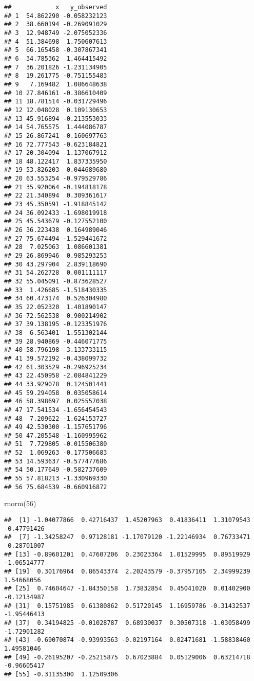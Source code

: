 \documentclass[
]{article}
\newenvironment{Shaded}{\begin{snugshade}}{\end{snugshade}}
\newcommand{\DecValTok}[1]{\textcolor[rgb]{0.00,0.00,0.81}{#1}}
\newcommand{\FunctionTok}[1]{\textcolor[rgb]{0.00,0.00,0.00}{#1}}
\newcommand{\NormalTok}[1]{#1}
\begin{document}
\begin{verbatim}
##            x   y_observed
## 1  54.862290 -0.058232123
## 2  38.660194 -0.269091029
## 3  12.948749 -2.075052336
## 4  51.384698  1.750607613
## 5  66.165458 -0.307867341
## 6  34.785362  1.464415492
## 7  36.201826 -1.231134905
## 8  19.261775 -0.751155483
## 9   7.169482  1.086648638
## 10 27.846161 -0.386610409
## 11 18.781514 -0.031729496
## 12 12.048028  0.109130653
## 13 45.916894 -0.213553033
## 14 54.765575  1.444086787
## 15 26.867241 -0.160697763
## 16 72.777543 -0.623184821
## 17 20.304094 -1.137067912
## 18 48.122417  1.837335950
## 19 53.826203  0.044689680
## 20 63.553254 -0.979529786
## 21 35.920064 -0.194818178
## 22 21.340894  0.309361617
## 23 45.350591 -1.918845142
## 24 36.092433 -1.698019918
## 25 45.543679 -0.127552100
## 26 36.223438  0.164989046
## 27 75.674494 -1.529441672
## 28  7.025063  1.086601381
## 29 26.869946  0.985293253
## 30 43.297904  2.839118690
## 31 54.262728  0.001111117
## 32 55.045091 -0.873628527
## 33  1.426685 -1.518430335
## 34 60.473174  0.526304980
## 35 22.052320  1.401890147
## 36 72.562538  0.900214902
## 37 39.138195 -0.123351976
## 38  6.563401 -1.551302144
## 39 28.940869 -0.446071775
## 40 58.796198 -3.133733115
## 41 39.572192 -0.438099732
## 42 61.303529 -0.296925234
## 43 22.450958 -2.084841229
## 44 33.929078  0.124501441
## 45 59.294058  0.035058614
## 46 58.398697  0.025557038
## 47 17.541534 -1.656454543
## 48  7.209622 -1.624153727
## 49 42.530300 -1.157651796
## 50 47.205548 -1.160995962
## 51  7.729805 -0.015506380
## 52  1.069263 -0.177506683
## 53 14.593637 -0.577477686
## 54 50.177649 -0.582737609
## 55 57.818213 -1.330969330
## 56 75.684539 -0.660916872
\end{verbatim}

\begin{Shaded}
\begin{Highlighting}[]
\FunctionTok{rnorm}\NormalTok{(}\DecValTok{56}\NormalTok{)}
\end{Highlighting}
\end{Shaded}

\begin{verbatim}
##  [1] -1.04077866  0.42716437  1.45207963  0.41836411  1.31079543 -0.47791426
##  [7] -1.34258247  0.97128181 -1.17079120 -1.22146934  0.76733471 -0.28701007
## [13] -0.89601201  0.47607206  0.23023364  1.01529995  0.89519929 -1.06514777
## [19]  0.30176964  0.86543374  2.20243579 -0.37957105  2.34999239  1.54668056
## [25]  0.74604647 -1.84350158  1.73832854  0.45041020  0.01402900 -0.12134987
## [31]  0.15751985  0.61380862  0.51720145  1.16959786 -0.31432537 -1.95446413
## [37]  0.34194825 -0.01028787  0.68930037  0.30507318 -1.03058499 -1.72901282
## [43] -0.69070874 -0.93993563 -0.02197164  0.02471681 -1.58838460  1.49581046
## [49] -0.26195207 -0.25215875  0.67023884  0.05129006  0.63214718 -0.96605417
## [55] -0.31135300  1.12509306
\end{verbatim}
\end{document}
